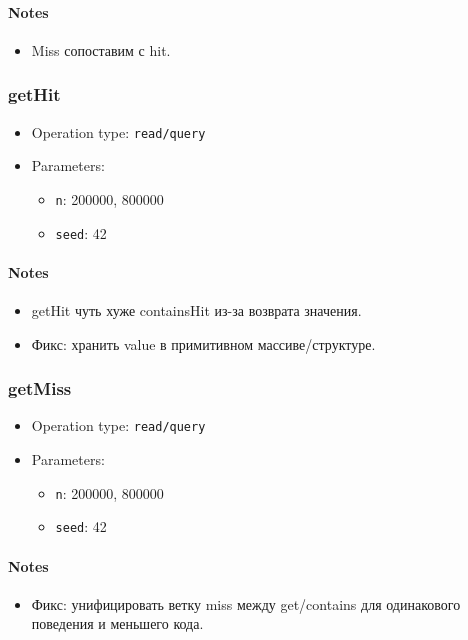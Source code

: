 \documentclass[
  10pt,
]{article}
\providecommand{\tightlist}{%
  \setlength{\itemsep}{0pt}\setlength{\parskip}{0pt}}
\begin{document}
\paragraph{Notes}\label{notes-13}

\begin{itemize}
\tightlist
\item
  Miss сопоставим с hit.
\end{itemize}

\subsubsection{getHit}\label{gethit-1}

\begin{itemize}
\tightlist
\item
  Operation type: \texttt{read/query}
\item
  Parameters:

  \begin{itemize}
  \tightlist
  \item
    \texttt{n}: 200000, 800000
  \item
    \texttt{seed}: 42
  \end{itemize}
\end{itemize}

\paragraph{Notes}\label{notes-14}

\begin{itemize}
\tightlist
\item
  getHit чуть хуже containsHit из-за возврата значения.
\item
  Фикс: хранить value в примитивном массиве/структуре.
\end{itemize}

\subsubsection{getMiss}\label{getmiss-1}

\begin{itemize}
\tightlist
\item
  Operation type: \texttt{read/query}
\item
  Parameters:

  \begin{itemize}
  \tightlist
  \item
    \texttt{n}: 200000, 800000
  \item
    \texttt{seed}: 42
  \end{itemize}
\end{itemize}

\paragraph{Notes}\label{notes-15}

\begin{itemize}
\tightlist
\item
  Фикс: унифицировать ветку miss между get/contains для одинакового
  поведения и меньшего кода.
\end{itemize}
\end{document}
